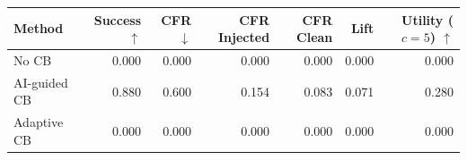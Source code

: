 \begin{tabular}{lrrrrrr}
\toprule
Method & Success $\uparrow$ & CFR $\downarrow$ & CFR Injected & CFR Clean & Lift & Utility ($c=5$) $\uparrow$ \\
\midrule
No CB & 0.000 & 0.000 & 0.000 & 0.000 & 0.000 & 0.000 \\
AI-guided CB & 0.880 & 0.600 & 0.154 & 0.083 & 0.071 & 0.280 \\
Adaptive CB & 0.000 & 0.000 & 0.000 & 0.000 & 0.000 & 0.000 \\
\bottomrule
\end{tabular}
